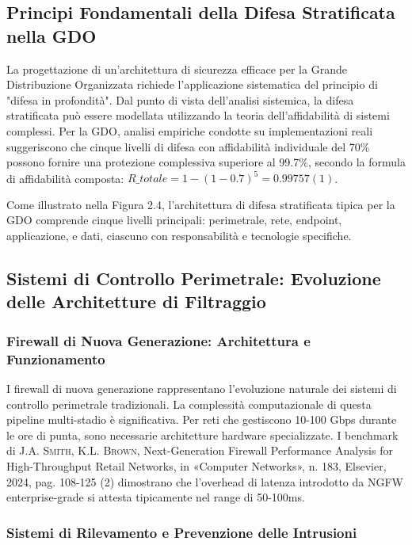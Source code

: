 \documentclass[12pt,a4paper,oneside]{book}
\newcommand{\autore}[1]{\textsc{#1}}
\newcommand{\citarticolo}[7]{%
    \autore{#1}, #2, in «#3», n. #4, #5, #6, pag. #7%
}
\begin{document}
\subsection{Principi Fondamentali della Difesa Stratificata nella GDO}

La progettazione di un'architettura di sicurezza efficace per la Grande Distribuzione Organizzata richiede l'applicazione sistematica del principio di "difesa in profondità". Dal punto di vista dell'analisi sistemica, la difesa stratificata può essere modellata utilizzando la teoria dell'affidabilità di sistemi complessi. Per la GDO, analisi empiriche condotte su implementazioni reali suggeriscono che cinque livelli di difesa con affidabilità individuale del 70$\%$ possono fornire una protezione complessiva superiore al 99.7$\%$, secondo la formula di affidabilità composta: $R\_totale = 1 - (1-0.7)^5 = 0.99757(1)$.

Come illustrato nella Figura 2.4, l'architettura di difesa stratificata tipica per la GDO comprende cinque livelli principali: perimetrale, rete, endpoint, applicazione, e dati, ciascuno con responsabilità e tecnologie specifiche.

\subsection{Sistemi di Controllo Perimetrale: Evoluzione delle Architetture di Filtraggio}

\subsubsection{Firewall di Nuova Generazione: Architettura e Funzionamento}

I firewall di nuova generazione rappresentano l'evoluzione naturale dei sistemi di controllo perimetrale tradizionali. La complessità computazionale di questa pipeline multi-stadio è significativa. Per reti che gestiscono 10-100 Gbps durante le ore di punta, sono necessarie architetture hardware specializzate. I benchmark di \citarticolo{J.A. Smith, K.L. Brown}{Next-Generation Firewall Performance Analysis for High-Throughput Retail Networks}{Computer Networks}{183}{Elsevier}{2024}{108-125}(2) dimostrano che l'overhead di latenza introdotto da NGFW enterprise-grade si attesta tipicamente nel range di 50-100ms.

\subsubsection{Sistemi di Rilevamento e Prevenzione delle Intrusioni}
\end{document}
